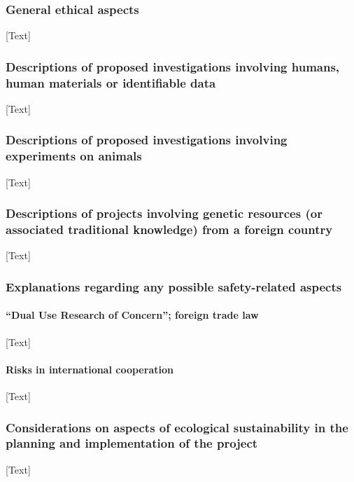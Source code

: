 \documentclass[a4paper,11pt]{article}
\begin{document}
\subsubsection{General ethical aspects}

[Text]

\subsubsection{Descriptions of proposed investigations involving humans, human materials or identifiable data}

[Text]

\subsubsection{Descriptions of proposed investigations involving experiments on animals}

[Text]

\subsubsection{Descriptions of projects involving genetic resources (or associated traditional knowledge) from a foreign country}

[Text]

\subsubsection{Explanations regarding any possible safety-related aspects}

\paragraph{``Dual Use Research of Concern''; foreign trade law}

[Text]

\paragraph{Risks in international cooperation}

[Text]

\subsubsection{Considerations on aspects of ecological sustainability in the planning and implementation of the project}

[Text]
\end{document}
